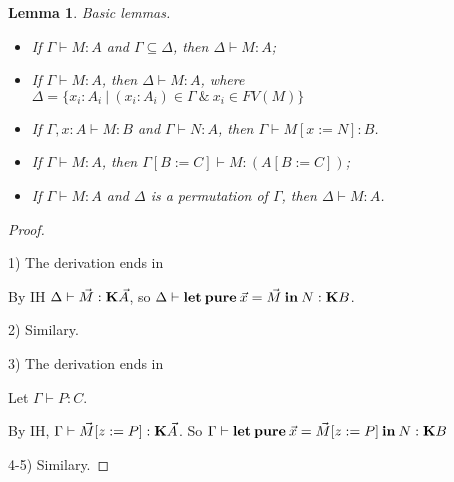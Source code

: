 \documentclass[a4paper]{article}
\newtheorem{lemma}{Lemma}
\begin{document}
\begin{lemma} Basic lemmas.

\begin{itemize}
  \item If $\Gamma \vdash M : A$ and $\Gamma \subseteq \Delta$, then $\Delta \vdash M : A$;
  \item If $\Gamma \vdash M : A$, then $\Delta \vdash M : A$, where $\Delta = \{ x_i : A_i \: | \: (x_i : A_i) \in \Gamma \: \& \: x_i \in FV(M) \}$
  \item If $\Gamma, x : A \vdash M : B$ and $\Gamma \vdash N : A$, then $\Gamma \vdash M [x := N] : B$.
  \item If $\Gamma \vdash M : A$, then $\Gamma [B := C] \vdash M : (A [B := C])$;
  \item If $\Gamma \vdash M : A$ and $\Delta$ is a permutation of $\Gamma$, then $\Delta \vdash M : A$.
\end{itemize}
\end{lemma}

\begin{proof}
  $ $

1) The derivation ends in

\begin{prooftree}
\end{prooftree}

By IH $\Delta \vdash \vec{M} : {\bf K} \vec{A}$, so $\Delta \vdash {\bf let \: pure \:} \vec{x} = \vec{M} {\: \bf in \: } N : {\bf K}B$.

  \vspace{\baselineskip}

2) Similary.

  \vspace{\baselineskip}

3) The derivation ends in

\begin{prooftree}
\end{prooftree}

Let $\Gamma \vdash P : C$.

By IH, $\Gamma \vdash \vec{M} [z := P] : {\bf K} \vec{A}$. So $\Gamma \vdash {\bf let \: pure \:} \vec{x} = \vec{M} [z := P] {\: \bf in \: } N : {\bf K}B$

  \vspace{\baselineskip}

4-5) Similary.

\end{proof}
\end{document}
